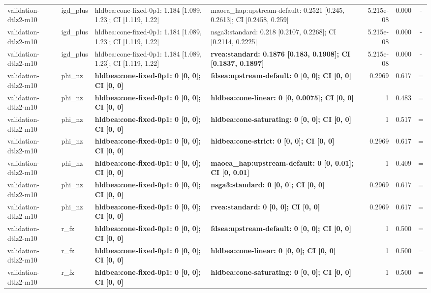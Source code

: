 \begin{tabular}{llllrrc}
validation-dtlz2-m10 & igd\_plus & hldbea:cone-fixed-0p1: 1.184 [1.089, 1.23]; CI [1.119, 1.22] & maoea\_hap:upstream-default: 0.2521 [0.245, 0.2613]; CI [0.2458, 0.259] & 5.215e-08 & 0.000 & - \\
validation-dtlz2-m10 & igd\_plus & hldbea:cone-fixed-0p1: 1.184 [1.089, 1.23]; CI [1.119, 1.22] & nsga3:standard: 0.218 [0.2107, 0.2268]; CI [0.2114, 0.2225] & 5.215e-08 & 0.000 & - \\
validation-dtlz2-m10 & igd\_plus & hldbea:cone-fixed-0p1: 1.184 [1.089, 1.23]; CI [1.119, 1.22] & \textbf{rvea:standard: 0.1876 [0.183, 0.1908]; CI [0.1837, 0.1897]} & 5.215e-08 & 0.000 & - \\
validation-dtlz2-m10 & phi\_nz & \textbf{hldbea:cone-fixed-0p1: 0 [0, 0]; CI [0, 0]} & \textbf{fdsea:upstream-default: 0 [0, 0]; CI [0, 0]} & 0.2969 & 0.617 & = \\
validation-dtlz2-m10 & phi\_nz & \textbf{hldbea:cone-fixed-0p1: 0 [0, 0]; CI [0, 0]} & \textbf{hldbea:cone-linear: 0 [0, 0.0075]; CI [0, 0]} & 1 & 0.483 & = \\
validation-dtlz2-m10 & phi\_nz & \textbf{hldbea:cone-fixed-0p1: 0 [0, 0]; CI [0, 0]} & \textbf{hldbea:cone-saturating: 0 [0, 0]; CI [0, 0]} & 1 & 0.517 & = \\
validation-dtlz2-m10 & phi\_nz & \textbf{hldbea:cone-fixed-0p1: 0 [0, 0]; CI [0, 0]} & \textbf{hldbea:cone-strict: 0 [0, 0]; CI [0, 0]} & 0.2969 & 0.617 & = \\
validation-dtlz2-m10 & phi\_nz & \textbf{hldbea:cone-fixed-0p1: 0 [0, 0]; CI [0, 0]} & \textbf{maoea\_hap:upstream-default: 0 [0, 0.01]; CI [0, 0.01]} & 1 & 0.409 & = \\
validation-dtlz2-m10 & phi\_nz & \textbf{hldbea:cone-fixed-0p1: 0 [0, 0]; CI [0, 0]} & \textbf{nsga3:standard: 0 [0, 0]; CI [0, 0]} & 0.2969 & 0.617 & = \\
validation-dtlz2-m10 & phi\_nz & \textbf{hldbea:cone-fixed-0p1: 0 [0, 0]; CI [0, 0]} & \textbf{rvea:standard: 0 [0, 0]; CI [0, 0]} & 0.2969 & 0.617 & = \\
validation-dtlz2-m10 & r\_fz & \textbf{hldbea:cone-fixed-0p1: 0 [0, 0]; CI [0, 0]} & \textbf{fdsea:upstream-default: 0 [0, 0]; CI [0, 0]} & 1 & 0.500 & = \\
validation-dtlz2-m10 & r\_fz & \textbf{hldbea:cone-fixed-0p1: 0 [0, 0]; CI [0, 0]} & \textbf{hldbea:cone-linear: 0 [0, 0]; CI [0, 0]} & 1 & 0.500 & = \\
validation-dtlz2-m10 & r\_fz & \textbf{hldbea:cone-fixed-0p1: 0 [0, 0]; CI [0, 0]} & \textbf{hldbea:cone-saturating: 0 [0, 0]; CI [0, 0]} & 1 & 0.500 & = \\

\end{tabular}
